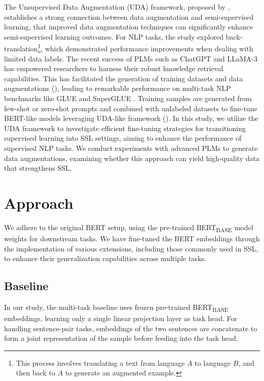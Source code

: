 \documentclass{article}
\begin{document}
The Unsupervised Data Augmentation (UDA) framework, proposed by \cite{xie2020unsupervised}, 
establishes a strong connection between data augmentation and semi-supervised learning,
that improved data augmentation techniques can significantly enhance semi-supervised learning 
outcomes. For NLP tasks, the study explored back-translation\footnote{This process involves 
translating a text from language $A$ to language $B$, and then back to $A$ to generate an 
augmented example.}, which demonstrated performance improvements when dealing with limited 
data labels.
The recent success of PLMs such as ChatGPT and LLaMA-3 
has empowered researchers to harness their robust knowledge retrieval capabilities. 
This has facilitated the generation of training datasets and data augmentations 
(\cite{zhong2022efficient, wang2021zerolabel, raffel2023exploring}), leading to 
remarkable performance on multi-task NLP benchmarks like GLUE \cite{wang2019glue} 
and SuperGLUE \cite{wang2019superglue}. Training samples are generated 
from few-shot or zero-shot prompts and combined with unlabeled datasets to 
fine-tune BERT-like models leveraging UDA-like framework 
(\cite{meng2022generating,wang2021zerolabel}).
In this study, we utilize the UDA framework to investigate efficient fine-tuning strategies for 
transitioning supervised learning into SSL settings, aiming to enhance the performance of 
supervised NLP tasks. We conduct experiments with advanced PLMs to generate data augmentations, 
examining whether this approach can yield high-quality data that strengthens SSL.


\section{Approach}

We adhere to the original BERT setup, using the pre-trained 
BERT\textsubscript{BASE} model weights for downstream tasks. We have fine-tuned the BERT 
embeddings through the implementation of various extensions, including those commonly 
used in SSL, to enhance their generalization capabilities 
across multiple tasks.

\subsection{Baseline} 
In our study, the multi-task baseline uses frozen pre-trained BERT\textsubscript{BASE} 
embeddings, learning only a single linear projection layer as task head. For handling
sentence-pair tasks, embeddings of the two sentences are concatenate to form
a joint representation of the sample before feeding into the task head.
\end{document}
